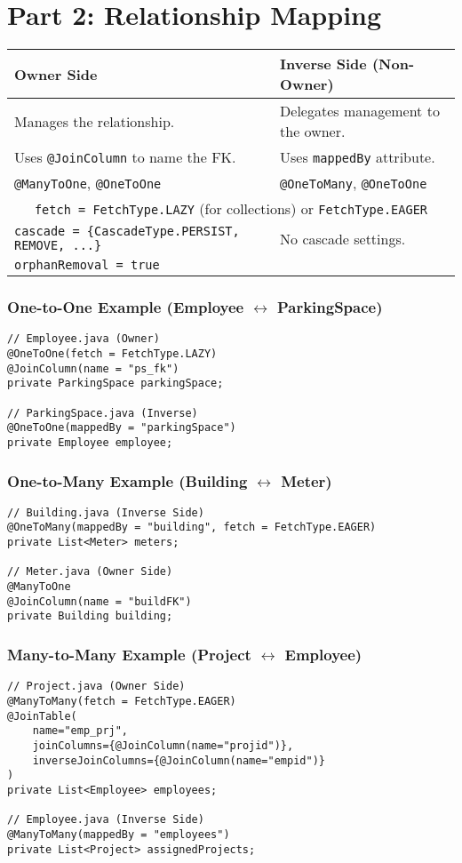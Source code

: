 \section*{Part 2: Relationship Mapping}
\begin{center}
\begin{tabular}{|l|l|}
\hline
\textbf{Owner Side} & \textbf{Inverse Side (Non-Owner)} \\
\hline
Manages the relationship. & Delegates management to the owner. \\
Uses \texttt{@JoinColumn} to name the FK. & Uses \texttt{mappedBy} attribute. \\
\hline
\texttt{@ManyToOne}, \texttt{@OneToOne} & \texttt{@OneToMany}, \texttt{@OneToOne} \\
\hline
\multicolumn{2}{|c|}{\texttt{fetch = FetchType.LAZY} (for collections) or \texttt{FetchType.EAGER}} \\
\hline
\texttt{cascade = \{CascadeType.PERSIST, REMOVE, ...\}} & No cascade settings. \\
\texttt{orphanRemoval = true} & \\
\hline
\end{tabular}
\end{center}

\subsubsection*{One-to-One Example (Employee $\leftrightarrow$ ParkingSpace)}
\begin{lstlisting}
// Employee.java (Owner)
@OneToOne(fetch = FetchType.LAZY)
@JoinColumn(name = "ps_fk")
private ParkingSpace parkingSpace;

// ParkingSpace.java (Inverse)
@OneToOne(mappedBy = "parkingSpace")
private Employee employee;
\end{lstlisting}

\subsubsection*{One-to-Many Example (Building $\leftrightarrow$ Meter)}
\begin{lstlisting}
// Building.java (Inverse Side)
@OneToMany(mappedBy = "building", fetch = FetchType.EAGER)
private List<Meter> meters;

// Meter.java (Owner Side)
@ManyToOne
@JoinColumn(name = "buildFK")
private Building building;
\end{lstlisting}

\subsubsection*{Many-to-Many Example (Project $\leftrightarrow$ Employee)}
\begin{lstlisting}
// Project.java (Owner Side)
@ManyToMany(fetch = FetchType.EAGER)
@JoinTable(
    name="emp_prj",
    joinColumns={@JoinColumn(name="projid")},
    inverseJoinColumns={@JoinColumn(name="empid")}
)
private List<Employee> employees;

// Employee.java (Inverse Side)
@ManyToMany(mappedBy = "employees")
private List<Project> assignedProjects;
\end{lstlisting}

